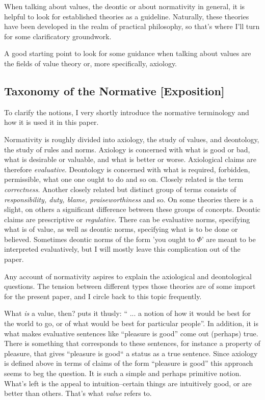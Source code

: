 \documentclass[12pt,numbers=noenddot]{scrartcl}
\begin{document}
When talking about values, the deontic or about normativity in general, it is helpful to look for established theories as a guideline. Naturally, these theories have been developed in the realm of practical philosophy, so that's where I'll turn for some clarificatory groundwork.

A good starting point to look for some guidance when talking about values are the fields of value theory or, more specifically, axiology.

\subsection{ Taxonomy of the Normative [Exposition]}

To clarify the notions, I very shortly introduce the normative terminology and how it is used it in this paper.

Normativity is roughly divided into axiology, the study of values, and deontology, the study of rules and norms. Axiology is concerned with what is good or bad, what is desirable or valuable, and what is better or worse. Axiological claims are therefore \emph{evaluative}. Deontology is concerned with what is required, forbidden, permissible, what one one ought to do and so on. Closely related is the term \emph{correctness}. Another closely related but distinct group of terms consists of \emph{responsibility, duty, blame, praiseworthiness} and so. On some theories there is a slight, on others a significant difference between these groups of concepts. Deontic claims are prescriptive or \emph{regulative}. There can be evaluative norms, specifying what is of value, as well as deontic norms, specifying what is to be done or believed. Sometimes deontic norms of the form 'you ought to $\Phi$' are meant to be interpreted evaluatively, but I will mostly leave this complication out of the paper.

Any account of normativity aspires to explain the axiological and deontological questions. The tension between different types those theories are of some import for the present paper, and I circle back to this topic frequently.

What \emph{is} a value, then? \textcite[79]{scanlon1998} puts it thusly: “ ... a notion of how it would be best for the world to go, or of what would be best for particular people”. In addition, it is what makes evaluative sentences like “pleasure is good” come out (perhaps) true. There is something that corresponds to these sentences, for instance a property of pleasure, that gives “pleasure is good“ a status as a true sentence. Since axiology is defined above in terms of claims of the form “pleasure is good” this approach seems to beg the question. It is such a simple and perhaps primitive notion. What's left is the appeal to intuition–certain things are intuitively good, or are better than others. That's what \emph{value} refers to.
\end{document}
